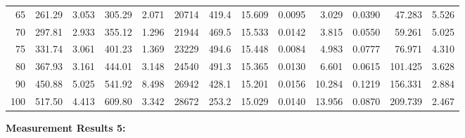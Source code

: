 \documentclass[10pt]{article}
\begin{document}
{\begin{tabular}{|r|rr|rr|rr|rr|rr|r|r|}
       65 &       261.29 &        3.053 &       305.29 &        2.071 &        20714 &        419.4 &       15.609 &       0.0095 &        3.029 &       0.0390 &       47.283 &        5.526 \\
       70 &       297.81 &        2.933 &       355.12 &        1.296 &        21944 &        469.5 &       15.533 &       0.0142 &        3.815 &       0.0550 &       59.261 &        5.025 \\
       75 &       331.74 &        3.061 &       401.23 &        1.369 &        23229 &        494.6 &       15.448 &       0.0084 &        4.983 &       0.0777 &       76.971 &        4.310 \\
       80 &       367.93 &        3.161 &       444.01 &        3.148 &        24540 &        491.3 &       15.365 &       0.0130 &        6.601 &       0.0615 &      101.425 &        3.628 \\
       90 &       450.88 &        5.025 &       541.92 &        8.498 &        26942 &        428.1 &       15.201 &       0.0156 &       10.284 &       0.1219 &      156.331 &        2.884 \\
      100 &       517.50 &        4.413 &       609.80 &        3.342 &        28672 &        253.2 &       15.029 &       0.0140 &       13.956 &       0.0870 &      209.739 &        2.467 \\
\hline
\end{tabular}
}

\vspace{3mm}

\noindent
{\large \bf Measurement Results 5:}
\vspace{3mm}
\end{document}
